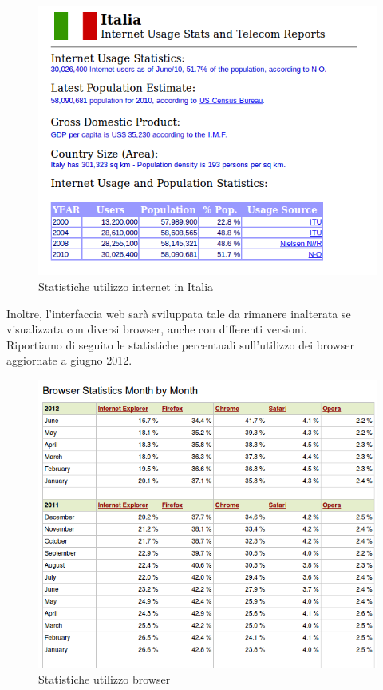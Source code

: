 \begin{figure}[H]
\centering
\caption{Statistiche utilizzo internet in Italia}
\includegraphics[scale=0.5]{images/cap1/statItaly} 
\end{figure}

\newpage
Inoltre, l'interfaccia web sarà sviluppata tale da rimanere inalterata se visualizzata con diversi browser, anche con differenti versioni.\\
Riportiamo di seguito le statistiche percentuali sull'utilizzo dei browser aggiornate a giugno 2012.

\begin{figure}[H]
\centering
\caption{Statistiche utilizzo browser}
\includegraphics[scale=0.5]{images/cap1/internetStat} 
\end{figure}


